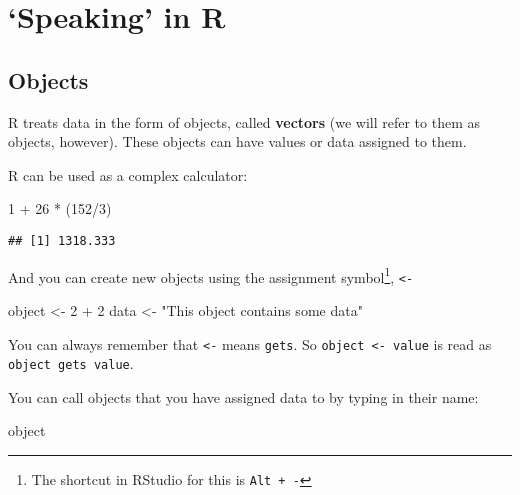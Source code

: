 \documentclass[]{tufte-handout}
\newenvironment{Shaded}{}{}
\newcommand{\DecValTok}[1]{\textcolor[rgb]{0.25,0.63,0.44}{#1}}
\newcommand{\NormalTok}[1]{#1}
\newcommand{\OperatorTok}[1]{\textcolor[rgb]{0.40,0.40,0.40}{#1}}
\newcommand{\StringTok}[1]{\textcolor[rgb]{0.25,0.44,0.63}{#1}}
\begin{document}
\hypertarget{speaking-in-r}{%
\section{`Speaking' in R}\label{speaking-in-r}}

\hypertarget{objects}{%
\subsection{Objects}\label{objects}}

R treats data in the form of objects, called \textbf{vectors} (we will
refer to them as objects, however). These objects can have values or
data assigned to them.

R can be used as a complex calculator:

\begin{Shaded}
\begin{Highlighting}[]
\DecValTok{1} \OperatorTok{+}\StringTok{ }\DecValTok{26} \OperatorTok{*}\StringTok{ }\NormalTok{(}\DecValTok{152}\OperatorTok{/}\DecValTok{3}\NormalTok{)}
\end{Highlighting}
\end{Shaded}

\begin{verbatim}
## [1] 1318.333
\end{verbatim}

And you can create new objects using the assignment symbol\footnote{The
  shortcut in RStudio for this is \texttt{Alt\ +\ -}},
\texttt{\textless{}-}

\begin{Shaded}
\begin{Highlighting}[]
\NormalTok{object <-}\StringTok{ }\DecValTok{2} \OperatorTok{+}\StringTok{ }\DecValTok{2}
\NormalTok{data <-}\StringTok{ "This object contains some data"}
\end{Highlighting}
\end{Shaded}

You can always remember that \texttt{\textless{}-} means \texttt{gets}.
So \texttt{object\ \textless{}-\ value} is read as
\texttt{object\ gets\ value}.

You can call objects that you have assigned data to by typing in their
name:

\begin{Shaded}
\begin{Highlighting}[]
\NormalTok{object}
\end{Highlighting}
\end{Shaded}
\end{document}
